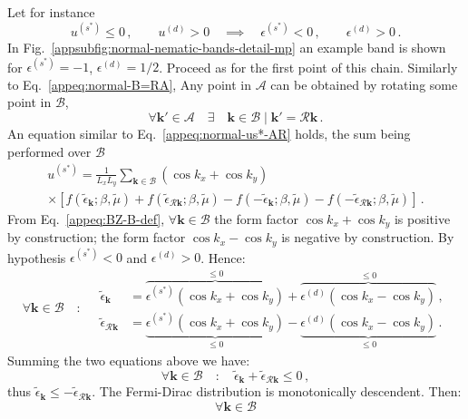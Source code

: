 \begin{tabproof}
\begin{enumerate}
	Let for instance
	\[
		u^{(s^*)} \le 0 \, ,
		\qquad
		u^{(d)} > 0
		\quad\implies\quad
		\epsilon^{(s^*)} < 0 \, ,
		\qquad
		\epsilon^{(d)} > 0 \, .
	\]
	In Fig.~\ref{appsubfig:normal-nematic-bands-detail-mp} an example band is shown for $\epsilon^{(s^*)}=-1$, $\epsilon^{(d)}=1/2$. Proceed as for the first point of this chain. Similarly to Eq.~\eqref{appeq:normal-B=RA}, Any point in $\mathcal{A}$ can be obtained by rotating some point in $\mathcal{B}$,
	\begin{equation}\label{appeq:normal-A=RB}
		\forall \mathbf{k}' \in \mathcal{A} 
		\quad\exists\quad \mathbf{k} \in \mathcal{B} \mid \mathbf{k}' = \mathcal{R} \mathbf{k} \, .
	\end{equation}
	An equation similar to Eq.~\eqref{appeq:normal-us*-AR} holds, the sum being performed over $\mathcal{B}$
	\begin{multline}
		u^{(s^*)} = \frac{1}{L_x L_y} \sum_{\mathbf{k}\in\mathcal{B}} (\cos k_x + \cos k_y) \\
		\times \left[
		f(\tilde{\epsilon}_\mathbf{k};\beta,\tilde{\mu}) + f(\tilde{\epsilon}_{\mathcal{R}\mathbf{k}};\beta,\tilde{\mu}) - f(-\tilde{\epsilon}_\mathbf{k};\beta,\tilde{\mu}) - f(-\tilde{\epsilon}_{\mathcal{R}\mathbf{k}};\beta,\tilde{\mu})
		\right] \, .
		\label{appeq:normal-us*-BR}
	\end{multline}
	From Eq.~\eqref{appeq:BZ-B-def}, $\forall \mathbf{k} \in \mathcal{B}$ the form factor $\cos k_x + \cos k_y$ is positive by construction; the form factor $\cos k_x - \cos k_y$ is negative by construction. By hypothesis $\epsilon^{(s^*)} < 0$ and $\epsilon^{(d)} > 0$. Hence:
	\[
	\forall \mathbf{k} \in \mathcal{B}
	\quad\colon\quad
	\begin{aligned}
		\tilde{\epsilon}_\mathbf{k} &= \overbrace{\epsilon^{(s^*)} \left( \cos k_x + \cos k_y \right)}^{\le 0} + \overbrace{\epsilon^{(d)}  \left( \cos k_x - \cos k_y \right) }^{\le 0} \, , \\
		\tilde{\epsilon}_{\mathcal{R}\mathbf{k}} &= \underbrace{\epsilon^{(s^*)} \left( \cos k_x + \cos k_y \right)}_{\le 0} - \underbrace{\epsilon^{(d)}  \left( \cos k_x - \cos k_y \right) }_{\le 0} \, .
	\end{aligned}
	\]
	Summing the two equations above we have:
	\[
		\forall \mathbf{k} \in \mathcal{B}
		\quad\colon\quad
		\tilde{\epsilon}_\mathbf{k} + \tilde{\epsilon}_{\mathcal{R}\mathbf{k}} \le 0 \, ,
	\]
	thus $\tilde{\epsilon}_\mathbf{k} \le -\tilde{\epsilon}_{\mathcal{R}\mathbf{k}}$.	The Fermi-Dirac distribution is monotonically descendent. Then:
	\[
	\forall \mathbf{k} \in \mathcal{B}
\]
\end{enumerate}
\end{tabproof}
